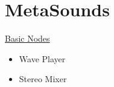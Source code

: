 \chapter{MetaSounds}
    \uline{Basic Nodes}
    \begin{itemize}
        \item Wave Player
        \item Stereo Mixer
    \end{itemize}